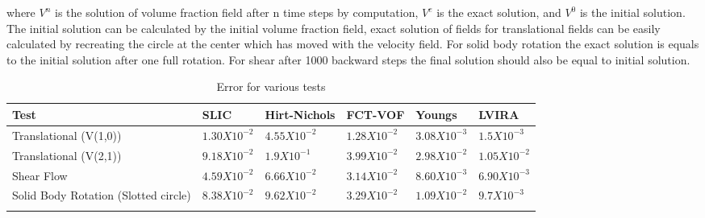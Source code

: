 where $V^n$ is the solution of volume fraction field after n time steps by computation, $V^e$ is the exact solution, and $V^0$ is the initial solution. The initial solution can be calculated by the initial 
volume fraction field, exact solution of fields for translational fields can be easily calculated by recreating the circle at the center which has moved with the velocity field. For solid body
rotation the exact solution is equals to the initial solution after one full rotation. For shear after 1000 backward steps the final solution should also be equal to initial solution.

\begin{table}[H]
  \begin{center}
    \caption{Error for various tests}
    \label{tab:samtab}
    \begin{tabular}{p{3cm}lllll}
      \toprule 
       Test & SLIC & Hirt-Nichols & FCT-VOF & Youngs & LVIRA  \\ 
      \midrule
      Translational (V(1,0)) & $1.30 X 10^{-2}$ & $4.55 X 10^{-2}$ & $1.28 X 10^{-2}$ & $3.08 X 10^{-3}$ & $1.5 X 10^{-3}$  \\ 
        Translational (V(2,1)) & $9.18 X 10^{-2}$ & $1.9 X 10^{-1}$ & $3.99 X 10^{-2}$ & $2.98 X 10^{-2}$ & $1.05 X 10^{-2}$  \\ 
      Shear Flow & $4.59 X 10^{-2}$ & $6.66 X 10^{-2}$ & $3.14 X 10^{-2}$ & $8.60 X 10^{-3}$ & $6.90 X 10^{-3}$  \\ 
       Solid Body Rotation (Slotted circle) & $8.38 X 10^{-2}$ & $9.62 X 10^{-2}$ & $3.29 X 10^{-2}$ & $1.09 X 10^{-2}$ & $9.7 X 10^{-3}$  \\ 
        
      \bottomrule \\
    \end{tabular}
  \end{center}
\end{table}


